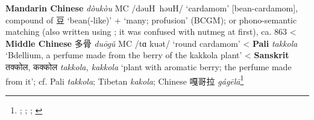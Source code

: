 \begin{etymology}\label{ety:doukou}
\textbf{Mandarin Chinese} {} \textit{dòukòu} MC /dəuH həuH/ `cardamom' [bean-cardamom], compound of 豆 `bean(-like)' +  `many; profusion' (BCGM); or phono-semantic matching (also written using ; it was confused with nutmeg at first), ca. 863
< \textbf{Middle Chinese} {多骨} \textit{duōgǔ} MC /tɑ kuət/ `round cardamom'
< \textbf{Pali} \textit{takkola} `Bdellium, a perfume made from the berry of the kakkola plant'
< \textbf{Sanskrit} {तक्कोल, कक्कोल} \textit{takkola, kakkola} `plant with aromatic berry; the perfume made from it'; cf. Pali \textit{takkola}; Tibetan  \textit{kakola}; Chinese 嘎哥拉 \textit{gágēlā}\footnote{\textcite[22]{donkin_between_2003}; \textcite[18:55]{yyzz}; \textcite[292]{pali_text_society_pali_1921}; \textcite[431, 241]{monier-williams_sanskrit-english_1899}}
\end{etymology}